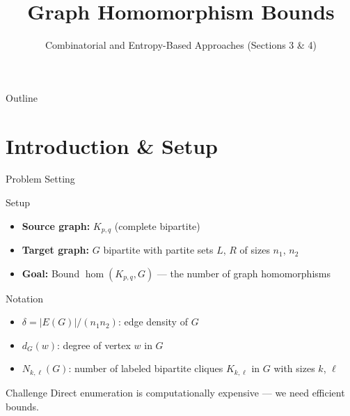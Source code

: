 \documentclass[aspectratio=169]{beamer}
\title{Graph Homomorphism Bounds}
\subtitle{Combinatorial and Entropy-Based Approaches (Sections 3 \& 4)}
\author{}
\date{}
\begin{document}
\begin{frame}
  \titlepage
\end{frame}

\begin{frame}{Outline}
  \tableofcontents
\end{frame}

\section{Introduction \& Setup}

\begin{frame}{Problem Setting}
  \begin{block}{Setup}
    \begin{itemize}
      \item \textbf{Source graph:} $K_{p,q}$ (complete bipartite)
      \item \textbf{Target graph:} $G$ bipartite with partite sets $L$, $R$ of sizes $n_1$, $n_2$
      \item \textbf{Goal:} Bound $\hom(K_{p,q}, G)$ --- the number of graph homomorphisms
    \end{itemize}
  \end{block}

  \begin{block}{Notation}
    \begin{itemize}
      \item $\delta = |E(G)|/(n_1 n_2)$: edge density of $G$
      \item $d_G(w)$: degree of vertex $w$ in $G$
      \item $N_{k,\ell}(G)$: number of labeled bipartite cliques $K_{k,\ell}$ in $G$ with sizes $k$, $\ell$
    \end{itemize}
  \end{block}

  \begin{alertblock}{Challenge}
    Direct enumeration is computationally expensive --- we need efficient bounds.
  \end{alertblock}
\end{frame}
\end{document}

